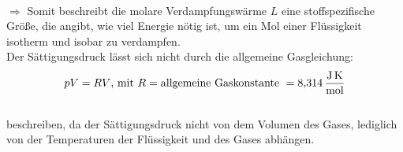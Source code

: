 \\$\Rightarrow$ Somit beschreibt die molare Verdampfungswärme $L$ eine stoffspezifische Größe, die angibt, wie viel Energie nötig ist,
um ein Mol einer Flüssigkeit isotherm und isobar zu verdampfen.\\
Der Sättigungsdruck lässt sich nicht durch die allgemeine Gasgleichung:
\begin{equation}
    pV=RV\text{, mit }R=\text{allgemeine Gaskonstante }= \SI{8.314}{\joule\per\mole\kelvin}\\
    \label{eqn:Gasgl}
\end{equation}
\\
beschreiben, da der Sättigungsdruck nicht von dem Volumen des Gases, lediglich von der Temperaturen der Flüssigkeit 
und des Gases abhängen.
\\

